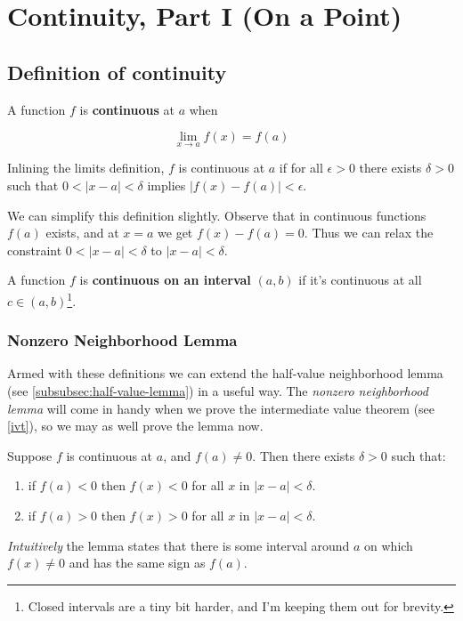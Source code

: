 \section{Continuity, Part I (On a Point)}

\subsection{Definition of continuity}

A function $f$ is \textbf{continuous} at $a$ when

\[\lim_{x\to a}f(x)=f(a)\]

Inlining the limits definition, $f$ is continuous at $a$ if for all
$\epsilon>0$ there exists $\delta>0$ such that $0<|x-a|<\delta$ implies
$|f(x)-f(a)|<\epsilon$.

\vs

We can simplify this definition slightly. Observe that in continuous
functions $f(a)$ exists, and at $x=a$ we get $f(x)-f(a)=0$. Thus we
can relax the constraint $0<|x-a|<\delta$ to $|x-a|<\delta$.

\vs

A function $f$ is \textbf{continuous on an interval} $(a, b)$ if it's
continuous at all $c\in(a,b)$\footnote{Closed intervals are a tiny bit
  harder, and I'm keeping them out for brevity.}.

\subsubsection*{Nonzero Neighborhood Lemma} \label{subsubsec:nonzero-lemma}

Armed with these definitions we can extend the half-value neighborhood
lemma (see \ref{subsubsec:half-value-lemma}) in a useful way. The
\textit{nonzero neighborhood lemma} will come in handy when we prove
the intermediate value theorem (see \ref{ivt}), so we may as well
prove the lemma now.

\vs

Suppose $f$ is continuous at $a$, and $f(a)\neq0$. Then there exists
$\delta>0$ such that:
\begin{enumerate}
\item if $f(a)<0$ then $f(x)<0$ for all $x$ in $|x-a|<\delta$.
\item if $f(a)>0$ then $f(x)>0$ for all $x$ in $|x-a|<\delta$.
\end{enumerate}

\textit{Intuitively} the lemma states that there is some interval
around $a$ on which $f(x)\neq0$ and has the same sign as $f(a)$.

